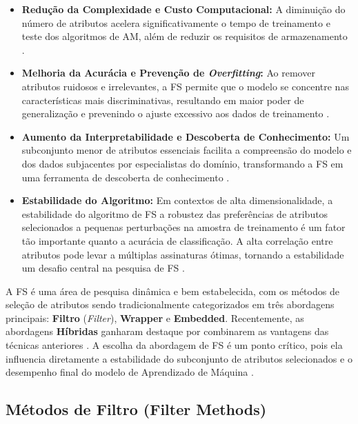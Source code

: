\begin{itemize} \item \textbf{Redução da Complexidade e Custo Computacional:} A diminuição do número de atributos acelera significativamente o tempo de treinamento e teste dos algoritmos de AM, além de reduzir os requisitos de armazenamento \cite{Theng2024}. \item \textbf{Melhoria da Acurácia e Prevenção de \textit{Overfitting}:} Ao remover atributos ruidosos e irrelevantes, a FS permite que o modelo se concentre nas características mais discriminativas, resultando em maior poder de generalização e prevenindo o ajuste excessivo aos dados de treinamento \cite{Dhal2022}. \item \textbf{Aumento da Interpretabilidade e Descoberta de Conhecimento:} Um subconjunto menor de atributos essenciais facilita a compreensão do modelo e dos dados subjacentes por especialistas do domínio, transformando a FS em uma ferramenta de descoberta de conhecimento \cite{Dhal2022} \cite{KHAIRE20221060}. \item \textbf{Estabilidade do Algoritmo:} Em contextos de alta dimensionalidade, a estabilidade do algoritmo de FS a robustez das preferências de atributos selecionados a pequenas perturbações na amostra de treinamento é um fator tão importante quanto a acurácia de classificação. A alta correlação entre atributos pode levar a múltiplas assinaturas ótimas, tornando a estabilidade um desafio central na pesquisa de FS \cite{KHAIRE20221060}. \end{itemize}

A FS é uma área de pesquisa dinâmica e bem estabelecida, com os métodos de seleção de atributos sendo tradicionalmente categorizados em três abordagens principais: \textbf{Filtro} (\textit{Filter}), \textbf{Wrapper} e \textbf{Embedded}. Recentemente, as abordagens \textbf{Híbridas} ganharam destaque por combinarem as vantagens das técnicas anteriores \cite{EBRAHIMIWARKIANI2025129372} \cite{10895909}\cite{Theng2024} \cite{SolorioFernandez2020} \cite{10.1007/978-3-031-23092-9_12}. A escolha da abordagem de FS é um ponto crítico, pois ela influencia diretamente a estabilidade do subconjunto de atributos selecionados e o desempenho final do modelo de Aprendizado de Máquina \cite{KHAIRE20221060} \cite{BARBIERI2024123667}.



\subsection{Métodos de Filtro (Filter Methods)}
\label{subsec:filter_methods}


